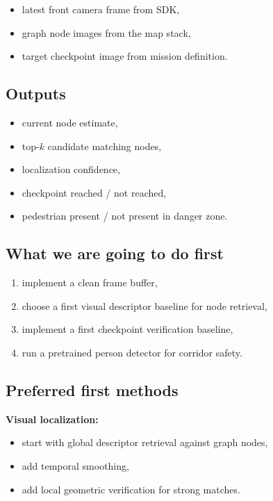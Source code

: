 \documentclass[11pt,a4paper]{article}
\begin{document}
\begin{itemize}[nosep]
  \item latest front camera frame from SDK,
  \item graph node images from the map stack,
  \item target checkpoint image from mission definition.
\end{itemize}

\subsection{Outputs}

\begin{itemize}[nosep]
  \item current node estimate,
  \item top-$k$ candidate matching nodes,
  \item localization confidence,
  \item checkpoint reached / not reached,
  \item pedestrian present / not present in danger zone.
\end{itemize}

\subsection{What we are going to do first}

\begin{enumerate}[nosep]
  \item implement a clean frame buffer,
  \item choose a first visual descriptor baseline for node retrieval,
  \item implement a first checkpoint verification baseline,
  \item run a pretrained person detector for corridor safety.
\end{enumerate}

\subsection{Preferred first methods}

\textbf{Visual localization:}
\begin{itemize}[nosep]
  \item start with global descriptor retrieval against graph nodes,
  \item add temporal smoothing,
  \item add local geometric verification for strong matches.
\end{itemize}
\end{document}

